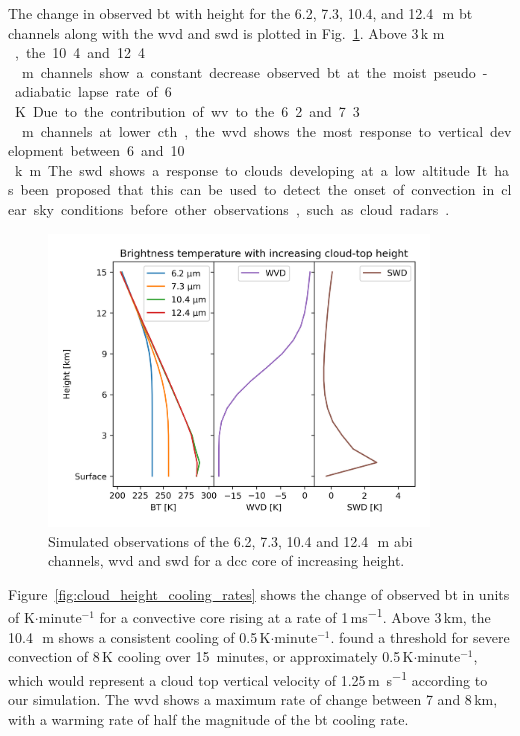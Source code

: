 The change in observed \acrshort{bt} with height for the 6.2, 7.3, 10.4, and 12.4\,\unit{\mu m} \acrshort{bt} channels along with the \acrshort{wvd} and \acrshort{swd} is plotted in Fig.~\ref{fig:cloud_height_channels}. 
Above 3\,\unit{k m }, the 10.4 and 12.4\,\unit{\mu m} channels show a constant decrease observed \acrshort{bt} at the moist pseudo-adiabatic lapse rate of 6\,\unit{K}.
Due to the contribution of \acrshort{wv} to the 6.2 and 7.3\,\unit{\mu m} channels at lower \acrfull{cth}, the \acrshort{wvd} shows the most response to vertical development between 6 and 10\,\unit{k m}.
The \acrshort{swd} shows a response to clouds developing at a low altitude.
It has been proposed that this can be used to detect the onset of convection in clear sky conditions before other observations, such as cloud radars \citep{lindsey_use_2014, lindsey_using_2018}.


\begin{figure}[tp]
    \includegraphics[width=0.9\textwidth]{figures/chapter1_06.png}
    \caption[
    Simulated observations of the 6.2, 7.3, 10.4 and 12.4\,\unit{\mu m} \acrshort{abi} channels, \acrshort{wvd} and \acrshort{swd} for a \acrshort{dcc} core of increasing height
    ]{
    Simulated observations of the 6.2, 7.3, 10.4 and 12.4\,\unit{\mu m} \acrshort{abi} channels, \acrshort{wvd} and \acrshort{swd} for a \acrshort{dcc} core of increasing height.
    }
    \label{fig:cloud_height_channels}
\end{figure}


Figure~\ref{fig:cloud_height_cooling_rates} shows the change of observed \acrshort{bt} in units of K$\cdot\mathrm{minute^{-1}}$ for a convective core rising at a rate of 1\,\unit{ms^{-1}}.
Above 3\,km, the 10.4\,\unit{\mu m} shows a consistent cooling of 0.5\,K$\cdot\mathrm{minute^{-1}}$.
\citet{roberts_nowcasting_2003} found a threshold for severe convection of 8\,\unit{K} cooling over 15~minutes, or approximately 0.5\,K$\cdot\mathrm{minute^{-1}}$, which would represent a cloud top vertical velocity of 1.25\,\unit{m s^{-1}} according to our simulation.
The \acrshort{wvd} shows a maximum rate of change between 7 and 8\,\unit{km}, with a warming rate of half the magnitude of the \acrshort{bt} cooling rate.


